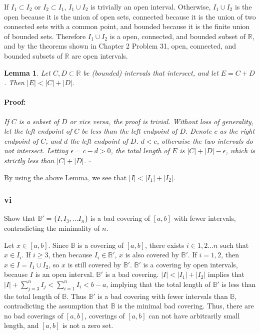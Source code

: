 \documentclass{article}
\newenvironment{proof}{\paragraph{Proof:}}{\hfill$\square$}
\newtheorem{lemma}[theorem]{Lemma}
\newcommand{\R}{\mathbb{R}}
\newcommand{\B}{\mathbb{B}}
\begin{document}
If $I_1 \subset I_2$ or $I_2 \subset I_1$, $I_1 \cup I_2$ is trivially an open interval. Otherwise, $I_1 \cup I_2$ is the open because it is the union of open sets, connected because it is the union of two connected sets with a common point, and bounded because it is the finite union of bounded sets. Therefore $I_1 \cup I_2$ is a open, connected, and bounded subset of $\R$, and by the theorems shown in Chapter 2 Problem 31, open, connected, and bounded subsets of $\R$ are open intervals.

\begin{lemma}
Let $C, D \subset \R$ be (bounded) intervals that intersect, and let $E = C + D$. Then $|E| < |C| + |D|$.

\begin{proof}
If $C$ is a subset of $D$ or vice versa, the proof is trivial. Without loss of generality, let the left endpoint of $C$ be less than the left endpoint of $D$. Denote $c$ as the right endpoint of $C$, and $d$ the left endpoint of $D$. $d < c$, otherwise the two intervals do not intersect. Letting $\epsilon = c - d > 0$, the total length of $E$ is $|C| + |D| - \epsilon$, which is strictly less than $|C| + |D|$.
\end{proof}
\end{lemma}

By using the above Lemma, we see that $|I| < |I_1| + |I_2|$.

\subsubsection*{vi}

Show that $\B' = \{I, I_3, \dots I_n\}$ is a bad covering of $[a, b]$ with fewer intervals, contradicting the minimality of $n$.

Let $x \in [a, b]$. Since $\B$ is a covering of $[a, b]$, there exists $i \in 1, 2 \dots n$ such that $x \in I_i$. If $i \geq 3$, then because $I_i \in \B'$, $x$ is also covered by $\B'$. If $i = 1, 2$, then $x \in I = I_1 \cup I_2$, so $x$ is still covered by $\B'$. $\B'$ is a covering by open intervals, because $I$ is an open interval. $\B'$ is a bad covering. $|I| < |I_1| + |I_2|$ implies that $|I| + \sum_{j=3}^n I_j < \sum_{i=1}^n I_i < b-a$, implying that the total length of $\B'$ is less than the total length of $\B$. Thus $\B'$ is a bad covering with fewer intervals than $\B$, contradicting the assumption that $\B$ is the minimal bad covering. Thus, there are no bad coverings of $[a, b]$, coverings of $[a, b]$ can not have arbitrarily small length, and $[a, b]$ is not a zero set.
\end{document}
